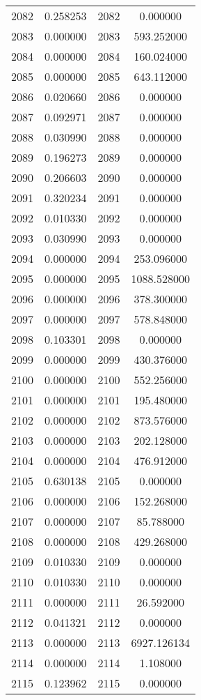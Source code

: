 \documentclass[12pt]{article}
\begin{document}
\begin{longtable}{@{}cccc@{}}
2082 & 0.258253 & 2082 & 0.000000 \\
2083 & 0.000000 & 2083 & 593.252000 \\
2084 & 0.000000 & 2084 & 160.024000 \\
2085 & 0.000000 & 2085 & 643.112000 \\
2086 & 0.020660 & 2086 & 0.000000 \\
2087 & 0.092971 & 2087 & 0.000000 \\
2088 & 0.030990 & 2088 & 0.000000 \\
2089 & 0.196273 & 2089 & 0.000000 \\
2090 & 0.206603 & 2090 & 0.000000 \\
2091 & 0.320234 & 2091 & 0.000000 \\
2092 & 0.010330 & 2092 & 0.000000 \\
2093 & 0.030990 & 2093 & 0.000000 \\
2094 & 0.000000 & 2094 & 253.096000 \\
2095 & 0.000000 & 2095 & 1088.528000 \\
2096 & 0.000000 & 2096 & 378.300000 \\
2097 & 0.000000 & 2097 & 578.848000 \\
2098 & 0.103301 & 2098 & 0.000000 \\
2099 & 0.000000 & 2099 & 430.376000 \\
2100 & 0.000000 & 2100 & 552.256000 \\
2101 & 0.000000 & 2101 & 195.480000 \\
2102 & 0.000000 & 2102 & 873.576000 \\
2103 & 0.000000 & 2103 & 202.128000 \\
2104 & 0.000000 & 2104 & 476.912000 \\
2105 & 0.630138 & 2105 & 0.000000 \\
2106 & 0.000000 & 2106 & 152.268000 \\
2107 & 0.000000 & 2107 & 85.788000 \\
2108 & 0.000000 & 2108 & 429.268000 \\
2109 & 0.010330 & 2109 & 0.000000 \\
2110 & 0.010330 & 2110 & 0.000000 \\
2111 & 0.000000 & 2111 & 26.592000 \\
2112 & 0.041321 & 2112 & 0.000000 \\
2113 & 0.000000 & 2113 & 6927.126134 \\
2114 & 0.000000 & 2114 & 1.108000 \\
2115 & 0.123962 & 2115 & 0.000000 \\

\end{longtable}
\end{document}
